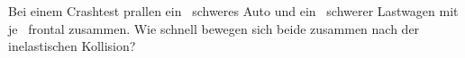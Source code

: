 Bei einem Crashtest prallen ein \mAuO\ schweres Auto und ein \mLwO\ schwerer Lastwagen mit je \vCrO\ frontal zusammen. Wie schnell bewegen sich beide zusammen nach der inelastischen Kollision?
